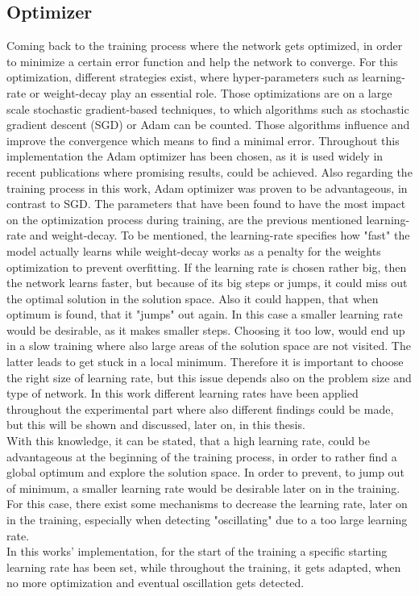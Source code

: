 \subsection{Optimizer}
Coming back to the training process where the network gets optimized, in order to minimize a certain error function and help the network to converge. For this optimization, different strategies exist, where hyper-parameters such as learning-rate or weight-decay play an essential role. Those optimizations are on a large scale stochastic gradient-based techniques, to which algorithms such as stochastic gradient descent (SGD) or Adam can be counted. Those algorithms influence and improve the convergence which means to find a minimal error. Throughout this implementation the Adam optimizer \cite{Kingma2014} has been chosen, as it is used widely in recent publications where promising results, could be achieved. Also regarding the training process in this work, Adam optimizer was proven to be advantageous, in contrast to SGD. The parameters that have been found to have the most impact on the optimization process during training, are the previous mentioned learning-rate and weight-decay. To be mentioned, the learning-rate specifies how "fast" the model actually learns while weight-decay works as a penalty for the weights optimization to prevent overfitting. If the learning rate is chosen rather big, then the network learns faster, but because of its big steps or jumps, it could miss out the optimal solution in the solution space. Also it could happen, that when optimum is found, that it "jumps" out again. In this case a smaller learning rate would be desirable, as it makes smaller steps. Choosing it too low, would end up in a slow training where also large areas of the solution space are not visited. The latter leads to get stuck in a local minimum. Therefore it is important to choose the right size of learning rate, but this issue depends also on the problem size and type of network. In this work different learning rates have been applied throughout the experimental part where also different findings could be made, but this will be shown and discussed, later on, in this thesis.\\
With this knowledge, it can be stated, that a high learning rate, could be advantageous at the beginning of the training process, in order to rather find a global optimum and explore the solution space. In order to prevent, to jump out of minimum, a smaller learning rate would be desirable later on in the training. For this case, there exist some mechanisms to decrease the learning rate, later on in the training, especially when detecting "oscillating" due to a too large learning rate.\\
In this works' implementation, for the start of the training a specific starting learning rate has been set, while throughout the training, it gets adapted, when no more optimization and eventual oscillation gets detected. 


